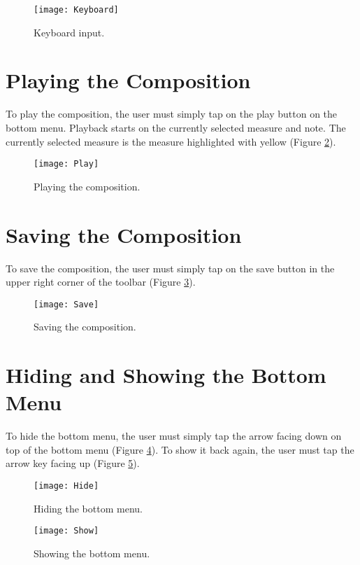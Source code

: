 \begin{figure}[H]
  \centering
  \texttt{[image: Keyboard]}
    \caption{Keyboard input.}
    \label{fig:keyboard}
\end{figure}

\section{Playing the Composition}
To play the composition, the user must simply tap on the play button on the bottom menu. Playback starts on the currently selected measure and note. The currently selected measure is the measure highlighted with yellow (Figure \ref{fig:play}).

\begin{figure}[H]
  \centering
  \texttt{[image: Play]}
    \caption{Playing the composition.}
    \label{fig:play}
\end{figure}

\section{Saving the Composition}
To save the composition, the user must simply tap on the save button in the upper right corner of the toolbar (Figure \ref{fig:save}).

\begin{figure}[H]
  \centering
  \texttt{[image: Save]}
    \caption{Saving the composition.}
    \label{fig:save}
\end{figure}

\section{Hiding and Showing the Bottom Menu}
To hide the bottom menu, the user must simply tap the arrow facing down on top of the bottom menu (Figure \ref{fig:hide}). To show it back again, the user must tap the arrow key facing up (Figure \ref{fig:show}).

\begin{figure}[H]
  \centering
  \texttt{[image: Hide]}
    \caption{Hiding the bottom menu.}
    \label{fig:hide}
\end{figure}

\begin{figure}[H]
  \centering
  \texttt{[image: Show]}
    \caption{Showing the bottom menu.}
    \label{fig:show}
\end{figure}

